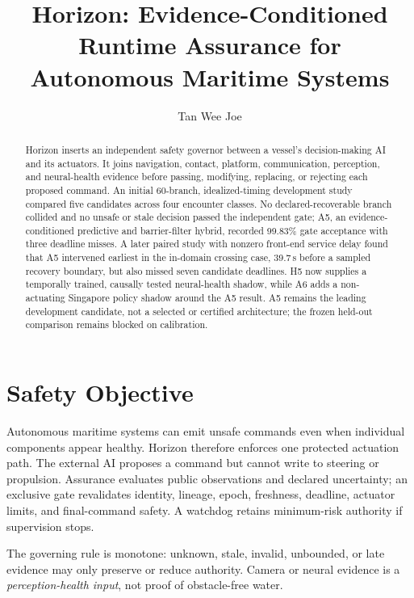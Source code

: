 \documentclass[sigconf,nonacm]{acmart}
\title{Horizon: Evidence-Conditioned Runtime Assurance for Autonomous Maritime Systems}
\author{Tan Wee Joe}
\affiliation{%
  \institution{University College London}
  \city{London}
  \country{United Kingdom}}
\begin{document}
\begin{abstract}
Horizon inserts an independent safety governor between a vessel's decision-making AI and its actuators. It joins navigation, contact, platform, communication, perception, and neural-health evidence before passing, modifying, replacing, or rejecting each proposed command. An initial 60-branch, idealized-timing development study compared five candidates across four encounter classes. No declared-recoverable branch collided and no unsafe or stale decision passed the independent gate; A5, an evidence-conditioned predictive and barrier-filter hybrid, recorded 99.83\% gate acceptance with three deadline misses. A later paired study with nonzero front-end service delay found that A5 intervened earliest in the in-domain crossing case, 39.7\,s before a sampled recovery boundary, but also missed seven candidate deadlines. H5 now supplies a temporally trained, causally tested neural-health shadow, while A6 adds a non-actuating Singapore policy shadow around the A5 result. A5 remains the leading development candidate, not a selected or certified architecture; the frozen held-out comparison remains blocked on calibration.
\end{abstract}
\maketitle

\section{Safety Objective}
Autonomous maritime systems can emit unsafe commands even when individual components appear healthy. Horizon therefore enforces one protected actuation path. The external AI proposes a command but cannot write to steering or propulsion. Assurance evaluates public observations and declared uncertainty; an exclusive gate revalidates identity, lineage, epoch, freshness, deadline, actuator limits, and final-command safety. A watchdog retains minimum-risk authority if supervision stops.

The governing rule is monotone: unknown, stale, invalid, unbounded, or late evidence may only preserve or reduce authority. Camera or neural evidence is a \emph{perception-health input}, not proof of obstacle-free water.
\end{document}

